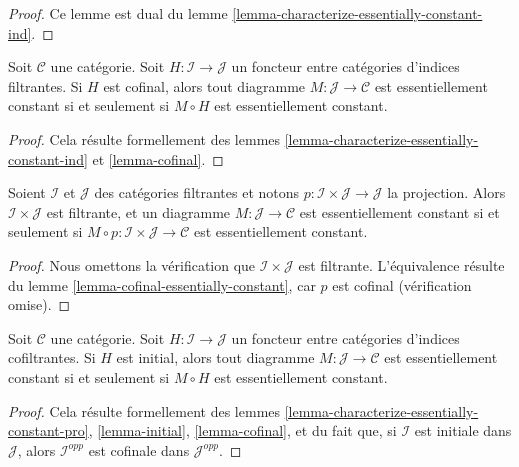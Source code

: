 \begin{proof}
Ce lemme est dual du lemme \ref{lemma-characterize-essentially-constant-ind}.
\end{proof}

\begin{lemma}
\label{lemma-cofinal-essentially-constant}
Soit $\mathcal{C}$ une catégorie. Soit $H : \mathcal{I} \to \mathcal{J}$ un
foncteur entre catégories d'indices filtrantes. Si $H$ est cofinal, alors tout
diagramme $M : \mathcal{J} \to \mathcal{C}$ est essentiellement constant si
et seulement si $M \circ H$ est essentiellement constant.
\end{lemma}

\begin{proof}
Cela résulte formellement des
lemmes \ref{lemma-characterize-essentially-constant-ind} et
\ref{lemma-cofinal}.
\end{proof}

\begin{lemma}
\label{lemma-essentially-constant-over-product}
Soient $\mathcal{I}$ et $\mathcal{J}$ des catégories filtrantes et notons
$p : \mathcal{I} \times \mathcal{J} \to \mathcal{J}$ la projection. Alors
$\mathcal{I} \times \mathcal{J}$ est filtrante, et un diagramme
$M : \mathcal{J} \to \mathcal{C}$ est essentiellement constant si et
seulement si $M \circ p : \mathcal{I} \times \mathcal{J} \to \mathcal{C}$
est essentiellement constant.
\end{lemma}

\begin{proof}
Nous omettons la vérification que $\mathcal{I} \times \mathcal{J}$ est
filtrante. L'équivalence résulte du
lemme \ref{lemma-cofinal-essentially-constant}, car $p$ est cofinal
(vérification omise).
\end{proof}

\begin{lemma}
\label{lemma-initial-essentially-constant}
Soit $\mathcal{C}$ une catégorie. Soit $H : \mathcal{I} \to \mathcal{J}$ un
foncteur entre catégories d'indices cofiltrantes. Si $H$ est initial, alors
tout diagramme $M : \mathcal{J} \to \mathcal{C}$ est essentiellement constant
si et seulement si $M \circ H$ est essentiellement constant.
\end{lemma}

\begin{proof}
Cela résulte formellement des
lemmes \ref{lemma-characterize-essentially-constant-pro},
\ref{lemma-initial}, \ref{lemma-cofinal}, et du fait que, si $\mathcal{I}$ est
initiale dans $\mathcal{J}$, alors $\mathcal{I}^{opp}$ est cofinale dans
$\mathcal{J}^{opp}$.
\end{proof}

